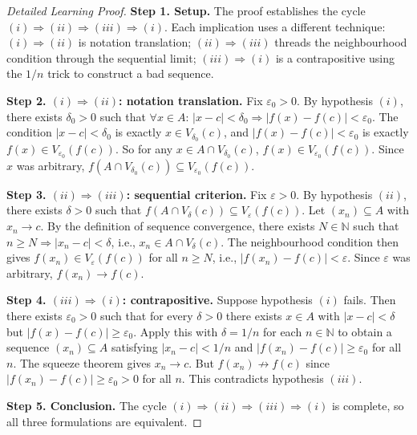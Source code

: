 \begin{proof}[Detailed Learning Proof]
\LRAProofBodyStart

\textbf{Step 1. Setup.} The proof establishes the cycle $(i) \Rightarrow
(ii) \Rightarrow (iii) \Rightarrow (i)$. Each implication uses a
different technique: $(i) \Rightarrow (ii)$ is notation translation;
$(ii) \Rightarrow (iii)$ threads the neighbourhood condition through
the sequential limit; $(iii) \Rightarrow (i)$ is a contrapositive
using the $1/n$ trick to construct a bad sequence.

\textbf{Step 2. $(i) \Rightarrow (ii)$: notation translation.}
Fix $\varepsilon_0 > 0$. By hypothesis $(i)$, there exists $\delta_0 > 0$
such that $\forall x \in A$: $|x - c| < \delta_0 \Rightarrow |f(x) -
f(c)| < \varepsilon_0$. The condition $|x - c| < \delta_0$ is exactly
$x \in V_{\delta_0}(c)$, and $|f(x) - f(c)| < \varepsilon_0$ is exactly
$f(x) \in V_{\varepsilon_0}(f(c))$. So for any $x \in A \cap
V_{\delta_0}(c)$, $f(x) \in V_{\varepsilon_0}(f(c))$. Since $x$ was
arbitrary, $f(A \cap V_{\delta_0}(c)) \subseteq V_{\varepsilon_0}(f(c))$.

\textbf{Step 3. $(ii) \Rightarrow (iii)$: sequential criterion.}
Fix $\varepsilon > 0$. By hypothesis $(ii)$, there exists $\delta > 0$
such that $f(A \cap V_\delta(c)) \subseteq V_\varepsilon(f(c))$. Let
$(x_n) \subseteq A$ with $x_n \to c$. By the definition of sequence
convergence, there exists $N \in \mathbb{N}$ such that $n \geq N
\Rightarrow |x_n - c| < \delta$, i.e., $x_n \in A \cap V_\delta(c)$.
The neighbourhood condition then gives $f(x_n) \in V_\varepsilon(f(c))$
for all $n \geq N$, i.e., $|f(x_n) - f(c)| < \varepsilon$. Since
$\varepsilon$ was arbitrary, $f(x_n) \to f(c)$.

\textbf{Step 4. $(iii) \Rightarrow (i)$: contrapositive.}
Suppose hypothesis $(i)$ fails. Then there exists $\varepsilon_0 > 0$
such that for every $\delta > 0$ there exists $x \in A$ with $|x - c|
< \delta$ but $|f(x) - f(c)| \geq \varepsilon_0$. Apply this with
$\delta = 1/n$ for each $n \in \mathbb{N}$ to obtain a sequence
$(x_n) \subseteq A$ satisfying $|x_n - c| < 1/n$ and $|f(x_n) -
f(c)| \geq \varepsilon_0$ for all $n$. The squeeze theorem gives
$x_n \to c$. But $f(x_n) \not\to f(c)$ since $|f(x_n) - f(c)| \geq
\varepsilon_0 > 0$ for all $n$. This contradicts hypothesis $(iii)$.

\textbf{Step 5. Conclusion.} The cycle $(i) \Rightarrow (ii) \Rightarrow
(iii) \Rightarrow (i)$ is complete, so all three formulations are equivalent.
\end{proof}

